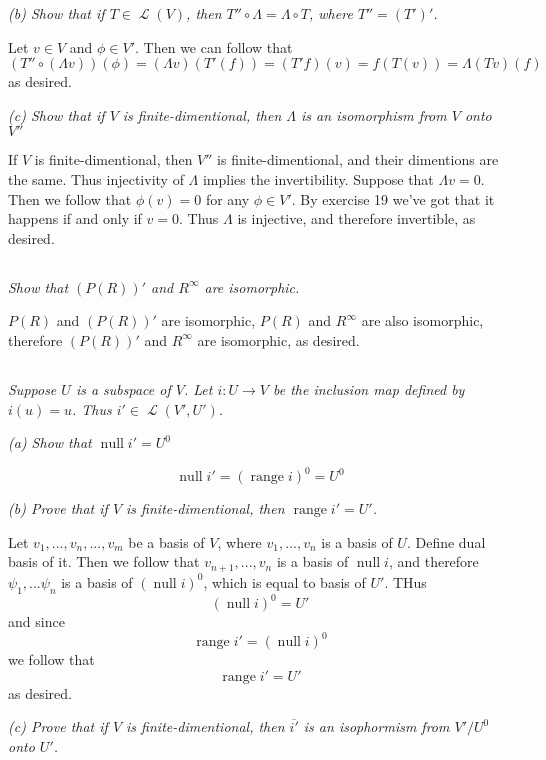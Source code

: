 \documentclass[11pt,oneside,titlepage]{book}
\DeclareMathOperator \map {\mathcal {L}}
\DeclareMathOperator \ns {null}
\DeclareMathOperator \range {range}
\begin{document}
\textit{(b) Show that if $T \in \map(V)$, then $T'' \circ \Lambda = \Lambda \circ T$, where
  $T'' = (T')'$.}

Let $v \in V$ and $\phi \in V'$. Then we can follow that
$$(T '' \circ (\Lambda v)) (\phi) =  (\Lambda v) (T'(f)) = (T'f)(v) = f(T(v)) = \Lambda (Tv) (f)$$
as desired.

\textit{(c) Show that if $V$ is finite-dimentional, then $\Lambda$ is an isomorphism from
  $V$ onto $V''$}

If $V$ is finite-dimentional, then $V''$ is finite-dimentional, and their dimentions are the same.
Thus injectivity of $\Lambda$ implies the invertibility. Suppose that $\Lambda v = 0$. Then we
follow that $\phi(v) = 0$ for any $\phi \in V'$. By exercise 19 we've got that it happens if
and only if $v = 0$. Thus $\Lambda$ is injective, and therefore invertible, as desired.


\subsection{}

\textit{Show that $(P(R))'$ and $R^\infty$ are isomorphic.}

$P(R)$ and $(P(R))'$ are isomorphic, $P(R)$ and $R^\infty$ are also isomorphic, therefore
$(P(R))'$ and $R^\infty$ are isomorphic, as desired.

\subsection{}

\textit{Suppose $U$ is a subspace of $V$. Let $i: U \to V$ be the inclusion map defined
  by $i(u) = u$. Thus $i' \in \map(V', U')$.}

\textit{(a) Show that $\ns i' = U^0$}

$$\ns i' = (\range i)^0 = U^0$$

\textit{(b) Prove that if $V$ is finite-dimentional, then  $\range i' = U'$.}

Let $v_1, ..., v_n, ..., v_m$ be a basis of $V$, where $v_1, ..., v_n$ is a basis of $U$. Define
dual basis of it. Then we follow that $v_{n + 1}, ..., v_n$ is a basis of $\ns i$, and therefore
$\psi_1, ... \psi_n$ is a basis of $(\ns i)^0$, which is equal to basis of $U'$. THus
$$(\ns i)^0 = U'$$
and since
$$\range i' = (\ns i)^0$$
we follow that
$$\range i' = U'$$
as desired.

\textit{(c) Prove that if $V$ is finite-dimentional, then $\overline{i'}$ is an isophormism from
  $V'/U^0$ onto $U'$.}
\end{document}
